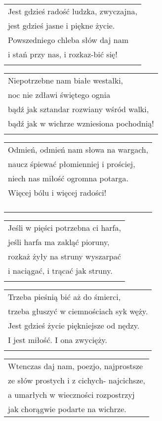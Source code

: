 \documentclass[a5paper]{article}
\begin{document}
\noindent
\begin{tabular}{@{}p{7.50cm}@{}}
Jest gdzieś radość ludzka, zwyczajna, \\
jest gdzieś jasne i piękne życie. \\
Powszedniego chleba słów daj nam \\
i stań przy nas, i rozkaz-bić się! \\ \\
\end{tabular}

\noindent
\begin{tabular}{@{}p{7.50cm}@{}}
Niepotrzebne nam białe westalki, \\
noc nie zdławi świętego ognia \\
bądź jak sztandar rozwiany wśród walki, \\
bądź jak w wichrze wzniesiona pochodnią! \\ \\
\end{tabular}

\noindent
\begin{tabular}{@{}p{7.50cm}@{}}
Odmień, odmień nam słowa na wargach, \\
naucz śpiewać płomienniej i prościej, \\
niech nas miłość ogromna potarga. \\
Więcej bólu i więcej radości! \\ \\ \\ \\ \\
\end{tabular}

\noindent
\begin{tabular}{@{}p{7.50cm}@{}}
Jeśli w pięści potrzebna ci harfa, \\
jeśli harfa ma zakląć pioruny, \\
rozkaż żyły na struny wyszarpać \\ 
i naciągać, i trącać jak struny. \\ \\
\end{tabular}

\noindent
\begin{tabular}{@{}p{7.50cm}@{}}
Trzeba pieśnią bić aż do śmierci, \\
trzeba głuszyć w ciemnościach syk węży. \\
Jest gdzieś życie piękniejsze od nędzy. \\
I jest miłość. I ona zwycięży. \\ \\
\end{tabular}

\noindent
\begin{tabular}{@{}p{7.50cm}@{}}
Wtenczas daj nam, poezjo, najprostsze \\
ze słów prostych i z cichych- najcichsze, \\
a umarłych w wieczności rozpostrzyj \\
jak chorągwie podarte na wichrze. \\
\end{tabular}
\end{document}
